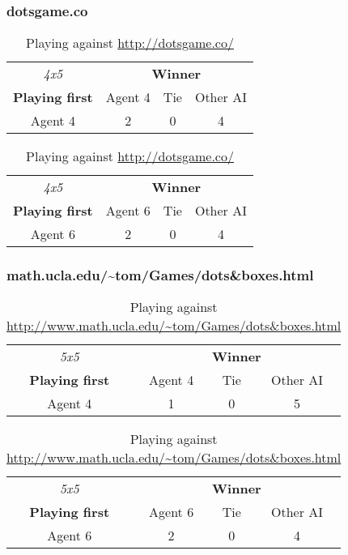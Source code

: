 \subsubsection{dotsgame.co}
\begin{table}[!h]
	\centering
	\label{result:dotsgameco}
	\begin{tabular}{c | c | c | c}
		\textit{4x5} & \multicolumn{3}{c}{\textbf{Winner}}        \\
		\textbf{Playing first} & Agent 4 & Tie & Other AI \\ \hline
		Agent 4 & 2 & 0 & 4
	\end{tabular}
	\quad
	\begin{tabular}{c | c | c | c}
		\textit{4x5} & \multicolumn{3}{c}{\textbf{Winner}}        \\
		\textbf{Playing first} & Agent 6 & Tie & Other AI \\ \hline
		Agent 6 & 2 & 0 & 4
	\end{tabular}
	\caption{Playing against \url{http://dotsgame.co/}}
\end{table}

\subsubsection{math.ucla.edu/\textasciitilde tom/Games/dots\&boxes.html}
\begin{table}[!h]
	\centering
	\label{result:uclaTom}
	\begin{tabular}{c | c | c | c}
		\textit{5x5} & \multicolumn{3}{c}{\textbf{Winner}}        \\
		\textbf{Playing first} & Agent 4 & Tie & Other AI \\ \hline
		Agent 4 & 1 & 0 & 5
	\end{tabular}
	\quad
	\begin{tabular}{c | c | c | c}
		\textit{5x5} & \multicolumn{3}{c}{\textbf{Winner}}        \\
		\textbf{Playing first} & Agent 6 & Tie & Other AI \\ \hline
		Agent 6 & 2 & 0 & 4
	\end{tabular}
	\caption{Playing against \url{http://www.math.ucla.edu/~tom/Games/dots&boxes.html}}
\end{table}